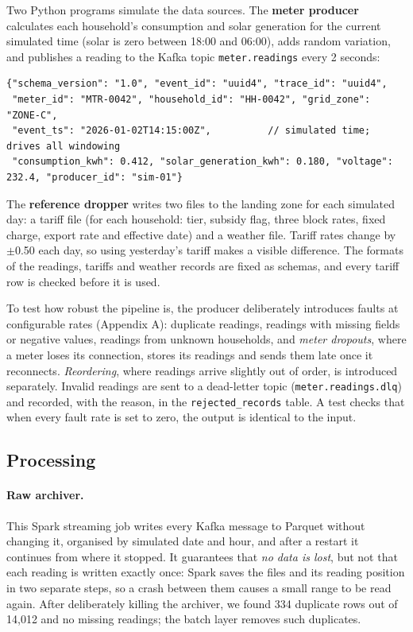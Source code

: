 \documentclass[11pt,a4paper]{article}
\begin{document}
Two Python programs simulate the data sources. The \textbf{meter producer} calculates each
household's consumption and solar generation for the current simulated time (solar is zero
between 18:00 and 06:00), adds random variation, and publishes a reading to the Kafka topic
\texttt{meter.readings} every 2 seconds:

\begin{lstlisting}[caption={A meter reading event, keyed by \texttt{household\_id}.},label={lst:event}]
{"schema_version": "1.0", "event_id": "uuid4", "trace_id": "uuid4",
 "meter_id": "MTR-0042", "household_id": "HH-0042", "grid_zone": "ZONE-C",
 "event_ts": "2026-01-02T14:15:00Z",          // simulated time; drives all windowing
 "consumption_kwh": 0.412, "solar_generation_kwh": 0.180, "voltage": 232.4, "producer_id": "sim-01"}
\end{lstlisting}

The \textbf{reference dropper} writes two files to the landing zone for each simulated day: a
tariff file (for each household: tier, subsidy flag, three block rates, fixed charge, export
rate and effective date) and a weather file. Tariff rates change by $\pm$0.50 each day, so
using yesterday's tariff makes a visible difference. The formats of the readings, tariffs
and weather records are fixed as schemas, and every tariff row is checked before it is used.

To test how robust the pipeline is, the producer deliberately introduces faults at
configurable rates (Appendix A): duplicate readings, readings with missing fields or negative
values, readings from unknown households, and \emph{meter dropouts}, where a meter loses its
connection, stores its readings and sends them late once it reconnects. \emph{Reordering},
where readings arrive slightly out of order, is introduced separately. Invalid readings are
sent to a dead-letter topic (\texttt{meter.readings.dlq}) and recorded, with the reason, in
the \texttt{rejected\_records} table. A test checks that when every fault rate is set to
zero, the output is identical to the input.

\subsection{Processing}

\paragraph{Raw archiver.} This Spark streaming job writes every Kafka message to Parquet
without changing it, organised by simulated date and hour, and after a restart it continues
from where it stopped. It guarantees that \emph{no data is lost}, but not that each reading
is written exactly once: Spark saves the files and its reading position in two separate
steps, so a crash between them causes a small range to be read again. After deliberately
killing the archiver, we found 334 duplicate rows out of 14{,}012 and no missing readings;
the batch layer removes such duplicates.
\end{document}
